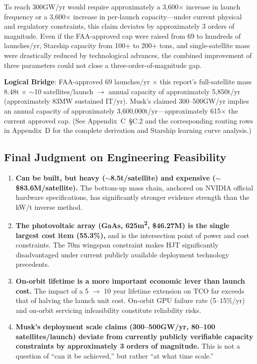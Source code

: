 To reach 300\;GW/yr would require approximately a 3,600$\times$ increase in launch frequency or a 3,600$\times$ increase in per-launch capacity---under current physical and regulatory constraints, this claim deviates by approximately 3 orders of magnitude. Even if the FAA-approved cap were raised from 69 to hundreds of launches/yr, Starship capacity from 100+ to 200+ tons, and single-satellite mass were drastically reduced by technological advances, the combined improvement of three parameters could not close a three-order-of-magnitude gap.

\textbf{Logical Bridge}: FAA-approved 69 launches/yr $\times$ this report's full-satellite mass 8.48\;t $\times$ $\sim$10 satellites/launch $\to$ annual capacity of approximately 5,850\;t/yr (approximately 83\;MW sustained IT/yr). Musk's claimed 300--500\;GW/yr implies an annual capacity of approximately 3,600,000\;t/yr---approximately 615$\times$ the current approved cap. (See Appendix~C~\S C.2 and the corresponding routing rows in Appendix~D for the complete derivation and Starship learning curve analysis.)

\subsection{Final Judgment on Engineering Feasibility}

\begin{enumerate}
    \item \textbf{Can be built, but heavy ($\sim$8.5\;t/satellite) and expensive ($\sim$\$83.6M/satellite).} The bottom-up mass chain, anchored on NVIDIA official hardware specifications, has significantly stronger evidence strength than the kW/t inverse method.
    \item \textbf{The photovoltaic array (GaAs, 625\;m\textsuperscript{2}, \$46.27M) is the single largest cost item (55.3\%),} and is the intersection point of power and cost constraints. The 70\;m wingspan constraint makes HJT significantly disadvantaged under current publicly available deployment technology precedents.
    \item \textbf{On-orbit lifetime is a more important economic lever than launch cost.} The impact of a 5 $\to$ 10 year lifetime extension on TCO far exceeds that of halving the launch unit cost. On-orbit GPU failure rate (5--15\%/yr) and on-orbit servicing infeasibility constitute reliability risks.
    \item \textbf{Musk's deployment scale claims (300--500\;GW/yr, 80--100 satellites/launch) deviate from currently publicly verifiable capacity constraints by approximately 3 orders of magnitude.} This is not a question of ``can it be achieved,'' but rather ``at what time scale.''
\end{enumerate}

